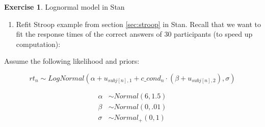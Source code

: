 \documentclass[12pt,]{krantz}
\newenvironment{Shaded}{\begin{snugshade}}{\end{snugshade}}
\newcommand{\KeywordTok}[1]{\textcolor[rgb]{0.13,0.29,0.53}{\textbf{#1}}}
\newcommand{\DataTypeTok}[1]{\textcolor[rgb]{0.13,0.29,0.53}{#1}}
\newcommand{\DecValTok}[1]{\textcolor[rgb]{0.00,0.00,0.81}{#1}}
\newcommand{\StringTok}[1]{\textcolor[rgb]{0.31,0.60,0.02}{#1}}
\newcommand{\CommentTok}[1]{\textcolor[rgb]{0.56,0.35,0.01}{\textit{#1}}}
\newcommand{\OperatorTok}[1]{\textcolor[rgb]{0.81,0.36,0.00}{\textbf{#1}}}
\newcommand{\NormalTok}[1]{#1}
\providecommand{\tightlist}{%
  \setlength{\itemsep}{0pt}\setlength{\parskip}{0pt}}
\theoremstyle{definition}
\theoremstyle{definition}
\theoremstyle{definition}
\newtheorem{exercise}{Exercise}[chapter]
\theoremstyle{remark}
\begin{document}
\begin{exercise}
\protect\hypertarget{exr:stroop}{}{\label{exr:stroop} }Lognormal model in
Stan \end{exercise}

\begin{enumerate}
\def\labelenumi{\alph{enumi}.}
\tightlist
\item
  Refit Stroop example from section \ref{sec:stroop} in Stan. Recall
  that we want to fit the response times of the correct answers of 30
  participants (to speed up computation):
\end{enumerate}

\begin{Shaded}
\end{Shaded}

Assume the following likelihood and priors:

\begin{equation}
  rt_n \sim LogNormal(\alpha + u_{subj[n],1}  + c\_cond_n \cdot  (\beta + u_{subj[n],2}), \sigma)
\end{equation}

\begin{equation}
 \begin{aligned}
   \alpha & \sim Normal(6, 1.5) \\
   \beta  & \sim Normal(0, .01) \\
    \sigma  &\sim Normal_+(0, 1)
 \end{aligned}
 \end{equation}
\end{document}
